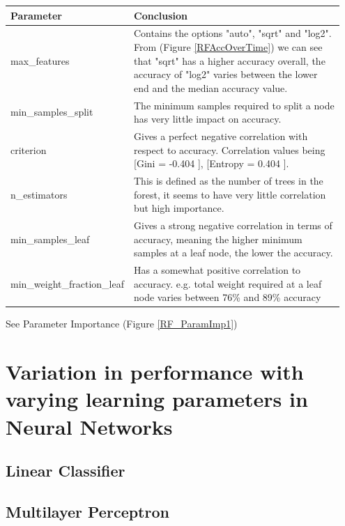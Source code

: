 \documentclass[11pt]{article}
\begin{document}
\begin{table}[ht]
  \centering
  \begin{tabular}{|p{0.25\linewidth} | p{0.7\linewidth}|} 
    \hline
    \textbf{Parameter}  & \textbf{Conclusion} \\ \hline
    max\_features & Contains the options "auto", "sqrt" and "log2". From (Figure \ref{RFAccOverTime}) we can see that "sqrt" has a higher accuracy overall, the accuracy of "log2" varies between the lower end and the median accuracy value.\\ \hline
    min\_samples\_split & The minimum samples required to split a node has very little impact on accuracy.  \\ \hline
    criterion & Gives a perfect negative correlation with respect to accuracy. Correlation values being [Gini = -0.404 ], [Entropy = 0.404 ]. \\ \hline
    n\_estimators & This is defined as the number of trees in the forest, it seems to have very little correlation but high importance. \\ \hline
    min\_samples\_leaf & Gives a strong negative correlation in terms of accuracy, meaning the higher minimum samples at a leaf node, the lower the accuracy. \\ \hline
    min\_weight\_fraction\_leaf & Has a somewhat positive correlation to accuracy. e.g. total weight required at a leaf node varies between 76\% and 89\% accuracy\\ \hline

  \end{tabular}
\end{table}\label{RF_Analysis_Table}
See Parameter Importance (Figure \ref{RF_ParamImp1})

\newpage
\section{Variation in performance with varying learning parameters in Neural Networks}
\subsection{Linear Classifier}



\newpage
\subsection{Multilayer Perceptron}
\end{document}
